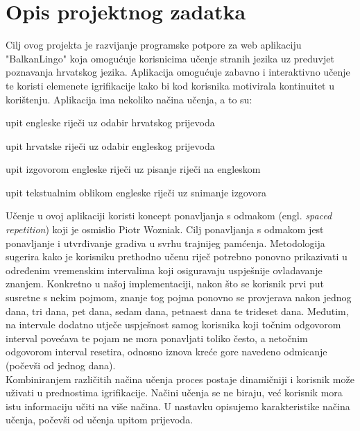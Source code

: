 \chapter{Opis projektnog zadatka}

		Cilj ovog projekta je razvijanje programske potpore za web aplikaciju "BalkanLingo" koja omogućuje korisnicima učenje stranih jezika uz preduvjet poznavanja hrvatskog jezika. Aplikacija omogućuje zabavno i interaktivno učenje te koristi elemenete igrifikacije kako bi kod korisnika motivirala kontinuitet u korištenju.
		Aplikacija ima nekoliko načina učenja, a to su: 
		\begin{packed_item}
			\item upit engleske riječi uz odabir hrvatskog prijevoda
			\item upit hrvatske riječi uz odabir engleskog prijevoda
			\item upit izgovorom engleske riječi uz pisanje riječi na engleskom
			\item upit tekstualnim oblikom engleske riječi uz snimanje izgovora
		\end{packed_item}

		Učenje u ovoj aplikaciji koristi  koncept ponavljanja s odmakom (engl. \textit{spaced repetition}) koji je osmislio Piotr Wozniak. Cilj ponavljanja s odmakom jest ponavljanje i utvrđivanje gradiva u svrhu trajnijeg pamćenja. Metodologija sugerira kako je korisniku prethodno učenu riječ potrebno ponovno prikazivati u određenim vremenskim intervalima koji osiguravaju uspješnije ovladavanje znanjem.
		\newline
		\newline
		Konkretno u našoj implementaciji, nakon što se korisnik prvi put susretne s nekim pojmom, znanje tog pojma ponovno se provjerava nakon jednog dana, tri dana, pet dana, sedam dana, petnaest dana te trideset dana. Međutim, na intervale dodatno utječe uspješnost samog korisnika koji točnim odgovorom interval povećava te pojam ne mora ponavljati toliko često, a netočnim odgovorom interval resetira, odnosno iznova kreće gore navedeno odmicanje (počevši od jednog dana). 
		\\
		\noindent Kombiniranjem različitih načina učenja proces postaje dinamičniji i korisnik može uživati u prednostima igrifikacije. Načini učenja se ne biraju, već korisnik mora istu informaciju učiti na više načina. U nastavku opisujemo karakteristike načina učenja, počevši od učenja upitom prijevoda.
		\\

